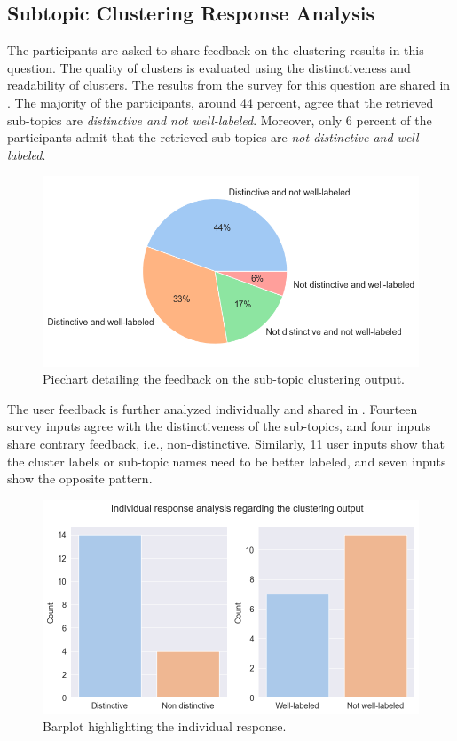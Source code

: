 \subsection{Subtopic Clustering Response Analysis}

The participants are asked to share feedback on the clustering results in this question. The quality of clusters is evaluated using the distinctiveness and readability of clusters. The results from the survey for this question are shared in . The majority of the participants, around 44 percent, agree that the retrieved sub-topics are \emph{distinctive and not well-labeled}. Moreover, only 6 percent of the participants admit that the retrieved sub-topics are \emph{not distinctive and well-labeled}.

\begin{figure}[h]
	\centering
	\includegraphics[width=.8\textwidth]{images/subplots/rating_piecharts.png}
	\caption[Sub-topic clustering output feedback.]{Piechart detailing the feedback on the sub-topic clustering output. \label{fig:question_1_piechart}}
\end{figure}

The user feedback is further analyzed individually and shared in . Fourteen survey inputs agree with the distinctiveness of the sub-topics, and four inputs share contrary feedback, i.e., non-distinctive. Similarly, 11 user inputs show that the cluster labels or sub-topic names need to be better labeled, and seven inputs show the opposite pattern.

\begin{figure}[h]
	\centering
	\includegraphics[width=.9\textwidth]{images/subplots/barplots.png}
	\caption{Barplot highlighting the individual response.  \label{fig:question_1_barplot}}
\end{figure}


